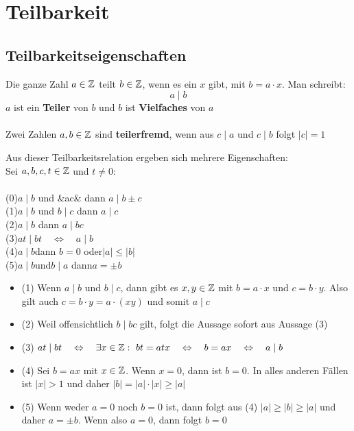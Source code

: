 \documentclass[../MAIN/main.tex]{subfiles}
\begin{document}
	\section{Teilbarkeit}

	\subsection{Teilbarkeitseigenschaften}

\begin{Definition}
Die ganze Zahl $a\in\mathbb{Z}$ teilt $b\in\mathbb{Z}$, wenn es ein $x$ gibt, mit $b=a\cdot x$. Man schreibt:
$$a \mid b$$
$a$ ist ein \textbf{Teiler} von $b$ und $b$ ist \textbf{Vielfaches} von $a$\\\\

Zwei Zahlen $a,b\in\mathbb{Z}$  sind \textbf{teilerfremd}, wenn aus $ c \mid  a  $ und $c\mid b$ folgt $|c| =1$
\end{Definition}

\begin{Theorem}
Aus dieser Teilbarkeitsrelation ergeben sich mehrere Eigenschaften:\\
Sei $a,b,c,t\in\mathbb{Z}$ und $t\neq0$:\\\\
(0)\qquad$a\mid b$ \quad und \quad&a\mid c& \quad dann \quad $a \mid b\pm c $\\
(1)\qquad$a\mid b$ \quad und \quad$b \mid c$ \quad dann \quad $a \mid c$\\
(2)\qquad$a\mid b$ \quad dann \quad $a \mid bc$\\
(3)\qquad$at\mid bt\quad\Leftrightarrow\quad a \mid b$\\
(4)\qquad$a\mid b$\quad dann \quad $b=0$ \quad oder\quad $|a|  \leq |b|  $\\
(5)\qquad$a\mid b$\quad und\quad $b\mid a$ \quad dann\quad $a=\pm b$
\end{Theorem}

\begin{Beweis}
\begin{itemize}
\item (1) \quad Wenn $a \mid b$ und $b \mid c$, dann gibt es $x,y\in\mathbb{Z}$ mit $b=a\cdot x$ und $c=b\cdot y$. Also gilt auch $c=b\cdot y=a\cdot(xy)$ und somit $a\mid c$\\
\item (2) \quad Weil offensichtlich $b\mid bc$ gilt, folgt die Aussage sofort aus Aussage (3) \\
\item (3)  \quad $at\mid bt\quad \Leftrightarrow\quad \exists x \in \mathbb{Z} : \, \, bt=atx \quad\Leftrightarrow \quad b=ax \quad\Leftrightarrow \quad a\mid b$ \\
\item (4) \quad Sei $b=ax$ mit $x\in\mathbb{Z}$. Wenn $x=0$, dann ist $b=0$. In alles anderen Fällen ist $|x| >1$ und daher $|b|  = |a|  \cdot |x|  \geq |a| $
\item (5) \quad Wenn weder $a=0$ noch $b=0$ ist, dann folgt aus (4) $|a| \geq|b| \geq|a| $ und daher $a=\pm b$. Wenn also  $a=0$, dann folgt $b=0$
\end{itemize}
\end{Beweis}
\end{document}

